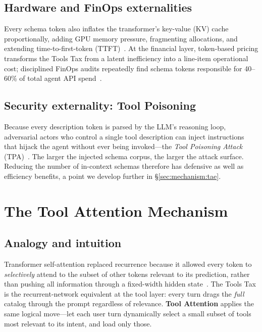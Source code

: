 \documentclass[11pt]{article}
\begin{document}
\subsection{Hardware and FinOps externalities}

Every schema token also inflates the transformer's key-value (KV) cache proportionally, adding GPU memory pressure, fragmenting allocations, and extending time-to-first-token (TTFT)~\citep{redis2026contextwindows}. At the financial layer, token-based pricing transforms the Tools Tax from a latent inefficiency into a line-item operational cost; disciplined FinOps audits repeatedly find schema tokens responsible for 40--60\% of total agent API spend~\citep{saha2026agentic}.

\subsection{Security externality: Tool Poisoning}

Because every description token is parsed by the LLM's reasoning loop, adversarial actors who control a single tool description can inject instructions that hijack the agent without ever being invoked---the \emph{Tool Poisoning Attack} (TPA)~\citep{wang2025mindguard_v1,smcp2026rfc}. The larger the injected schema corpus, the larger the attack surface. Reducing the number of in-context schemas therefore has defensive as well as efficiency benefits, a point we develop further in \S\ref{sec:mechanism:tae}.

\section{The Tool Attention Mechanism}\label{sec:mechanism}

\subsection{Analogy and intuition}

Transformer self-attention replaced recurrence because it allowed every token to \emph{selectively} attend to the subset of other tokens relevant to its prediction, rather than pushing all information through a fixed-width hidden state~\citep{vaswani2017attention}. The Tools Tax is the recurrent-network equivalent at the tool layer: every turn drags the \emph{full} catalog through the prompt regardless of relevance. \textbf{Tool Attention} applies the same logical move---let each user turn dynamically select a small subset of tools most relevant to its intent, and load only those.
\end{document}
